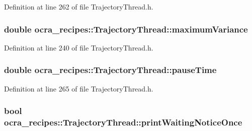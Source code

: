 Definition at line 262 of file Trajectory\+Thread.\+h.

\subsubsection[{\texorpdfstring{maximum\+Variance}{maximumVariance}}]{\setlength{\rightskip}{0pt plus 5cm}double ocra\+\_\+recipes\+::\+Trajectory\+Thread\+::maximum\+Variance\hspace{0.3cm}{\ttfamily [protected]}}\hypertarget{classocra__recipes_1_1TrajectoryThread_a16c8d8bfbbfb45b1a3fa9b08781123aa}{}\label{classocra__recipes_1_1TrajectoryThread_a16c8d8bfbbfb45b1a3fa9b08781123aa}


Definition at line 240 of file Trajectory\+Thread.\+h.

\subsubsection[{\texorpdfstring{pause\+Time}{pauseTime}}]{\setlength{\rightskip}{0pt plus 5cm}double ocra\+\_\+recipes\+::\+Trajectory\+Thread\+::pause\+Time\hspace{0.3cm}{\ttfamily [protected]}}\hypertarget{classocra__recipes_1_1TrajectoryThread_a9436d523ebb66dfa9bbc8ed458306e46}{}\label{classocra__recipes_1_1TrajectoryThread_a9436d523ebb66dfa9bbc8ed458306e46}


Definition at line 265 of file Trajectory\+Thread.\+h.

\subsubsection[{\texorpdfstring{print\+Waiting\+Notice\+Once}{printWaitingNoticeOnce}}]{\setlength{\rightskip}{0pt plus 5cm}bool ocra\+\_\+recipes\+::\+Trajectory\+Thread\+::print\+Waiting\+Notice\+Once\hspace{0.3cm}{\ttfamily [protected]}}\hypertarget{classocra__recipes_1_1TrajectoryThread_a4dbc25516ce41a0bc82c49e004a1b933}{}\label{classocra__recipes_1_1TrajectoryThread_a4dbc25516ce41a0bc82c49e004a1b933}


